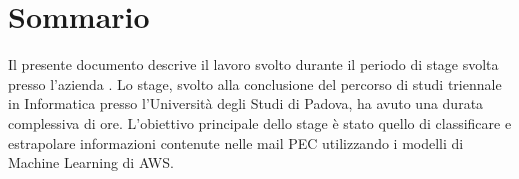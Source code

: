 \cleardoublepage
{}
{}
\begingroup
\let\clearpage\relax
\let\cleardoublepage\relax

\chapter*{Sommario}

Il presente documento descrive il lavoro svolto durante il periodo di stage svolta presso l'azienda \myCompany. Lo stage, svolto alla conclusione del percorso di studi triennale in Informatica presso l'Università degli Studi di Padova, ha avuto una durata complessiva di \myHours ore. L'obiettivo principale dello stage è stato quello di classificare e estrapolare informazioni contenute nelle mail PEC utilizzando i modelli di Machine Learning di AWS.

\endgroup
\vfill
